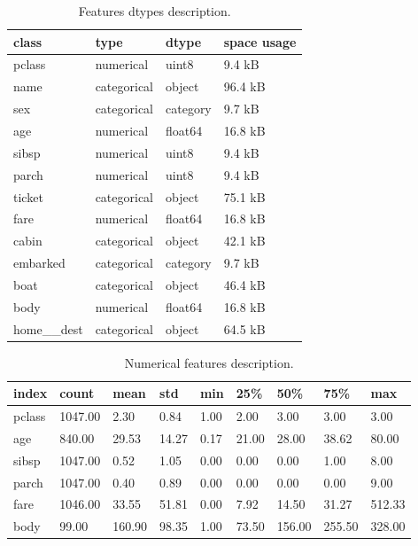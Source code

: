 \documentclass{article}%
\begin{document}
\begin{table}[H]%
\begin{center}%
\begin{tabular}{l l l l}%
\hline%
\textbf{class}&\textbf{type}&\textbf{dtype}&\textbf{space usage}\\%
\hline%
pclass&numerical&uint8&9.4 kB\\%
name&categorical&object&96.4 kB\\%
sex&categorical&category&9.7 kB\\%
age&numerical&float64&16.8 kB\\%
sibsp&numerical&uint8&9.4 kB\\%
parch&numerical&uint8&9.4 kB\\%
ticket&categorical&object&75.1 kB\\%
fare&numerical&float64&16.8 kB\\%
cabin&categorical&object&42.1 kB\\%
embarked&categorical&category&9.7 kB\\%
boat&categorical&object&46.4 kB\\%
body&numerical&float64&16.8 kB\\%
home\_\_dest&categorical&object&64.5 kB\\%
\hline%
\end{tabular}%
\end{center}%
\caption{Features dtypes description.}%
\end{table}

%


\begin{table}[H]%
\begin{center}%
\begin{tabular}{l l l l l l l l l}%
\hline%
\textbf{index}&\textbf{count}&\textbf{mean}&\textbf{std}&\textbf{min}&\textbf{25\%}&\textbf{50\%}&\textbf{75\%}&\textbf{max}\\%
\hline%
pclass&1047.00&2.30&0.84&1.00&2.00&3.00&3.00&3.00\\%
age&840.00&29.53&14.27&0.17&21.00&28.00&38.62&80.00\\%
sibsp&1047.00&0.52&1.05&0.00&0.00&0.00&1.00&8.00\\%
parch&1047.00&0.40&0.89&0.00&0.00&0.00&0.00&9.00\\%
fare&1046.00&33.55&51.81&0.00&7.92&14.50&31.27&512.33\\%
body&99.00&160.90&98.35&1.00&73.50&156.00&255.50&328.00\\%
\hline%
\end{tabular}%
\end{center}%
\caption{Numerical features description.}%
\end{table}
\end{document}
